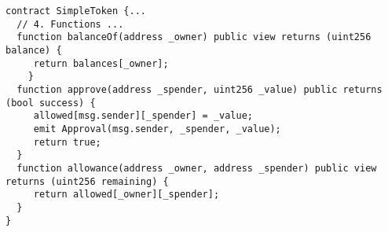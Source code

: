\begin{lstlisting}[language=Solidity]
contract SimpleToken {...
  // 4. Functions ...
  function balanceOf(address _owner) public view returns (uint256 balance) {
     return balances[_owner];
    }
  function approve(address _spender, uint256 _value) public returns (bool success) {
     allowed[msg.sender][_spender] = _value;
     emit Approval(msg.sender, _spender, _value); 
     return true;
  }
  function allowance(address _owner, address _spender) public view returns (uint256 remaining) {
     return allowed[_owner][_spender];
  }
}
\end{lstlisting}